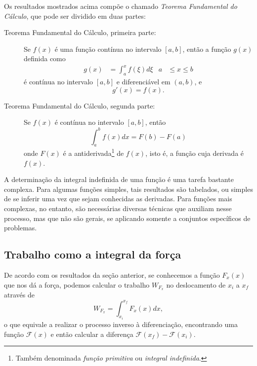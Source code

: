 Os resultados mostrados acima compõe o chamado \emph{Teorema Fundamental do Cálculo}, que pode ser dividido em duas partes:
\begin{description}
  \item[Teorema Fundamental do Cálculo, primeira parte:] Se $f(x)$ é uma função contínua no intervalo $[a,b]$, então a função $g(x)$ definida como
  \begin{align}
    g(x) &= \int_a^x f(\xi) d\xi & a&\leq x \leq b
  \end{align}
  é contínua no intervalo $[a,b]$ e diferenciável em $(a,b)$, e
  \begin{equation}
    g'(x) = f(x).
  \end{equation}
  \item[Teorema Fundamental do Cálculo, segunda parte:] Se $f(x)$ é contínua no intervalo $[a,b]$, então
  \begin{equation}
    \int_a^b f(x) dx = F(b) - F(a)
  \end{equation}
  onde $F(x)$ é a antiderivada\footnote{Também denominada \emph{função primitiva} ou \emph{integral indefinida}.} de $f(x)$, isto é, a função cuja derivada é $f(x)$.
\end{description}

A determinação da integral indefinida de uma função é uma tarefa bastante complexa. Para algumas funções simples, tais resultados são tabelados, ou simples de se inferir uma vez que sejam conhecidas as derivadas. Para funções mais complexas, no entanto, são necessárias diversas técnicas que auxiliam nesse processo, mas que não são gerais, se aplicando somente a conjuntos específicos de problemas.

\subsection{Trabalho como a integral da força}

De acordo com os resultados da seção anterior, se conhecemos a função $F_x(x)$ que nos dá a força, podemos calcular o trabalho $W_{F_x}$ no deslocamento de $x_i$ a $x_f$através de
\begin{equation}\label{Eq:TrabalhoIntegral}
    W_{F_x} = \int_{x_i}^{x_f} F_x(x) dx,
\end{equation}
%
o que equivale a realizar o processo inverso à diferenciação, encontrando uma função $\mathcal{F}(x)$ e então calcular a diferença $\mathcal{F}(x_f) - \mathcal{F}(x_i)$. 

